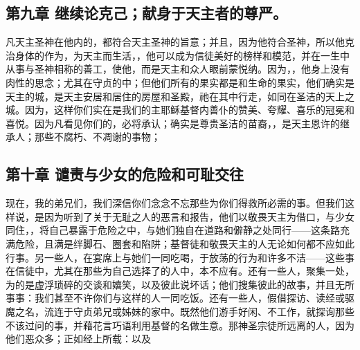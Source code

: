 
\subsection{第九章 继续论克己；献身于天主者的尊严。}

凡天主圣神在他内的，都符合天主圣神的旨意；并且，因为他符合圣神，所以他克治身体的作为，为天主而生活，，他可以成为信徒美好的榜样和模范，并在一生中从事与圣神相称的善工，使他，而是天主和众人眼前蒙悦纳。因为，，他身上没有肉性的思念；尤其在守贞的中；但他们所有的果实都是和生命的果实，他们确实是天主的城，是天主安居和居住的房屋和圣殿，祂在其中行走，如同在圣洁的天上之城。因为，这样你们实在是我们的主耶稣基督内善仆的赞美、夸耀、喜乐的冠冕和喜悦。因为凡看见你们的，必将承认；确实是尊贵圣洁的苗裔，，是天主恩许的继承人；那些不腐朽、不凋谢的事物；\par


\subsection{第十章 谴责与少女的危险和可耻交往}

现在，我的弟兄们，我们深信你们念念不忘那些为你们得救所必需的事。但我们这样说，是因为听到了关于无耻之人的恶言和报告，他们以敬畏天主为借口，与少女同住，，将自己暴露于危险之中，与她们独自在道路和僻静之处同行——这条路充满危险，且满是绊脚石、圈套和陷阱；基督徒和敬畏天主的人无论如何都不应如此行事。另一些人，在宴席上与她们一同吃喝，于放荡的行为和许多不洁——这些事在信徒中，尤其在那些为自己选择了的人中，本不应有。还有一些人，聚集一处，为的是虚浮琐碎的交谈和嬉笑，以及彼此说坏话；他们搜集彼此的故事，并且无所事事：我们甚至不许你们与这样的人一同吃饭。还有一些人，假借探访、读经或驱魔之名，流连于守贞弟兄或姊妹的家中。既然他们游手好闲、不工作，就探询那些不该过问的事，并藉花言巧语利用基督的名做生意。那神圣宗徒所远离的人，因为他们恶众多；正如经上所载：以及\par


